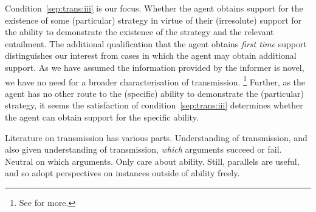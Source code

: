 \documentclass[10pt]{article}
\begin{document}
\begin{note}
  Condition~\ref{sep:trans:iii} is our focus.
  Whether the agent obtains support for the existence of some (particular) strategy in virtue of their (irresolute) support for the ability to demonstrate the existence of the strategy and the relevant entailment.
  The additional qualification that the agent obtains \emph{first time} support distinguishes our interest from cases in which the agent may obtain additional support.
  As we have assumed the information provided by the informer is novel, we have no need for a broader characterisation of transmission.\nolinebreak
  \footnote{
    See \textcite{Moretti:2018we} for more.
  }
  Further, as the agent has no other route to the (specific) ability to demonstrate the (particular) strategy, it seems the satisfaction of condition~\ref{sep:trans:iii} determines whether the agent can obtain support for the specific ability.
\end{note}

\begin{note}[Transmission]
  Literature on transmission has various parts.
  Understanding of transmission, and also given understanding of transmission, \emph{which} arguments succeed or fail.
  Neutral on which arguments.
  Only care about ability.
  Still, parallels are useful, and so adopt perspectives on instances outside of ability freely.
\end{note}
\end{document}
